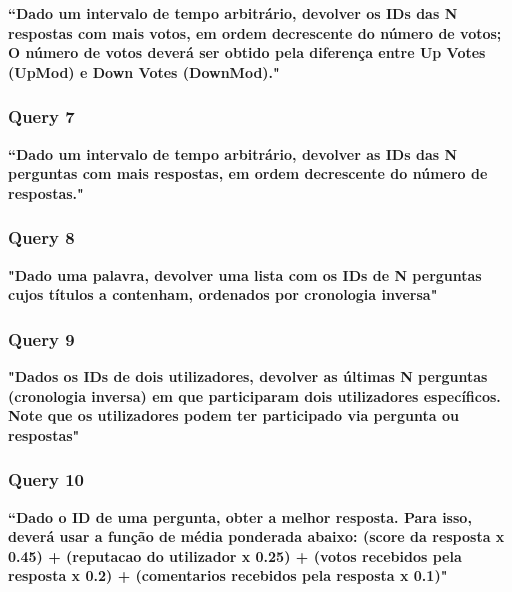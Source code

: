\documentclass[a4paper]{article}
\begin{document}
\textbf{“Dado um intervalo de tempo arbitrário, devolver os IDs das N respostas
com mais votos, em ordem decrescente do número de votos; O número de votos deverá
ser obtido pela diferença entre Up Votes (UpMod) e Down Votes (DownMod)."}

\vspace{0.1cm}

\subsubsection*{Query 7}
\label{sec:query7}

\textbf{“Dado um intervalo de tempo arbitrário, devolver as IDs das N perguntas
com mais respostas, em ordem decrescente do número de respostas."}

\vspace{0.1cm}


\subsubsection*{Query 8}
\label{sec:query8}

\textbf{"Dado uma palavra, devolver uma lista com os IDs de
N perguntas cujos títulos a contenham, ordenados por cronologia inversa"}

\vspace{0.1cm}



\subsubsection*{Query 9}
\label{sec:query9}

\textbf{"Dados os IDs de dois utilizadores, devolver as últimas
N perguntas (cronologia inversa) em que participaram dois utilizadores específicos.
Note que os utilizadores podem ter participado via pergunta ou respostas"}

\vspace{0.1cm}


\subsubsection*{Query 10}
\label{sec:query10}

\textbf{“Dado o ID de uma pergunta, obter a melhor resposta.
Para isso, deverá usar a função de média ponderada abaixo: (score da resposta x 0.45)
+ (reputacao do utilizador x 0.25) + (votos recebidos pela resposta x 0.2) +
(comentarios recebidos pela resposta x 0.1)"}\par
\end{document}
